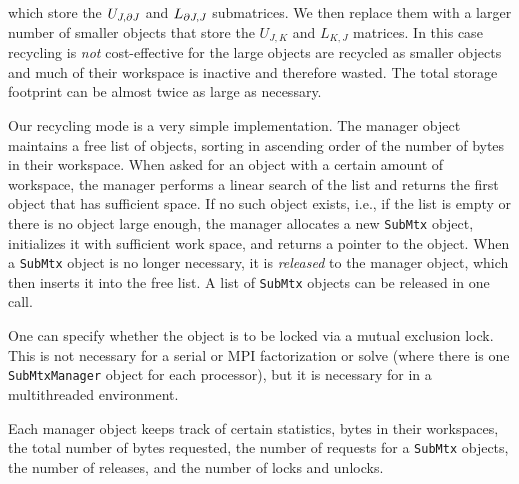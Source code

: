 which store the $U_{J,{\partial}{J}}$ and $L_{{\partial}{J},J}$ 
submatrices.
We then replace them with a larger number of smaller objects
that store the $U_{J,K}$ and $L_{K,J}$ matrices.
In this case recycling is {\it not} cost-effective for the large
objects are recycled as smaller objects and much of their workspace
is inactive and therefore wasted.
The total storage footprint can be almost twice as large as
necessary.
\par
Our recycling mode is a very simple implementation.
The manager object maintains a free list of objects, 
sorting in ascending order of
the number of bytes in their workspace.
When asked for an object with a certain amount of workspace,
the manager performs a linear search of the list and returns the first
object that has sufficient space.
If no such object exists, i.e., if the list is empty or there is no
object large enough, the manager allocates a new {\tt SubMtx} object, 
initializes it with sufficient work space, 
and returns a pointer to the object.
When a {\tt SubMtx} object is no longer necessary, it is
{\it released} to the manager object, which then
inserts it into the free list.
A list of {\tt SubMtx} objects can be released in one call.
\par
One can specify whether the object is to be locked via a mutual
exclusion lock.
This is not necessary for a serial or MPI factorization or solve 
(where there is one {\tt SubMtxManager} object for each processor),
but it is necessary for in a multithreaded environment.
\par
Each manager object keeps track of certain statistics,
bytes in their workspaces, the total number of bytes requested,
the number of requests for a {\tt SubMtx} objects, the number of
releases, and the number of locks and unlocks.
